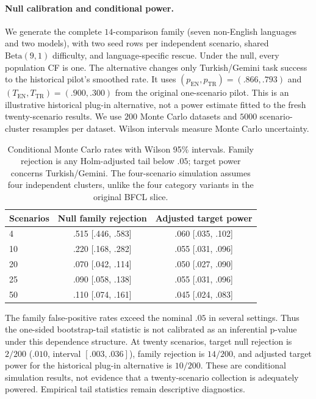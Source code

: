 \documentclass[11pt]{article}
\begin{document}
\paragraph{Null calibration and conditional power.} We generate the complete
$14$-comparison family (seven non-English languages and two models), with two
seed rows per independent scenario, shared $\mathrm{Beta}(9,1)$ difficulty,
and language-specific rescue. Under the null, every population CF is one.
The alternative changes only Turkish/Gemini task success to the historical pilot's
smoothed rate. It uses $(p_{\mathrm{EN}},p_{\mathrm{TR}})=(.866,.793)$ and
$(T_{\mathrm{EN}},T_{\mathrm{TR}})=(.900,.300)$ from the original one-scenario
pilot. This is an illustrative historical plug-in alternative, not a power
estimate fitted to the fresh twenty-scenario results.
We use $200$ Monte Carlo datasets and $5000$ scenario-cluster resamples per
dataset. Wilson intervals measure Monte Carlo uncertainty.

\begin{table}[ht]
\centering\footnotesize
\setlength{\tabcolsep}{3pt}
\begin{tabular}{lcc}
\toprule
Scenarios & Null family rejection & Adjusted target power \\
\midrule
4 & .515 [.446, .583] & .060 [.035, .102] \\
10 & .220 [.168, .282] & .055 [.031, .096] \\
20 & .070 [.042, .114] & .050 [.027, .090] \\
25 & .090 [.058, .138] & .055 [.031, .096] \\
50 & .110 [.074, .161] & .045 [.024, .083] \\
\bottomrule
\end{tabular}
\caption{Conditional Monte Carlo rates with Wilson 95\% intervals.
Family rejection is any Holm-adjusted tail below $.05$; target power concerns
Turkish/Gemini. The four-scenario simulation assumes four independent clusters,
unlike the four category variants in the original BFCL slice.}
\label{tab:calibration_power}
\end{table}

The family false-positive rates exceed the nominal $.05$ in several settings.
Thus the one-sided bootstrap-tail statistic is not calibrated as an inferential
p-value under this dependence structure. At twenty scenarios, target null
rejection is $2/200$ ($.010$, interval $[.003,.036]$), family rejection is
$14/200$, and adjusted target power for the historical plug-in alternative is
$10/200$. These are conditional
simulation results, not evidence that a twenty-scenario collection is adequately
powered. Empirical tail statistics remain descriptive diagnostics.
\end{document}
